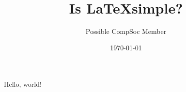 \documentclass{article}
\title{Is \LaTeX simple?}
\date{\today}
\author{Possible CompSoc Member}
\begin{document}
    \maketitle

    \newpage
    Hello, world!
\end{document}
